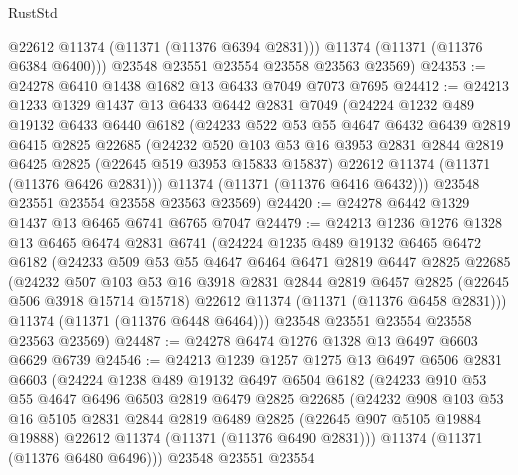 \begin{lexlean}{RustStd}
\begin{coremodule}
          @22612
          @11374
          (@11371 (@11376 @6394 @2831)))
        @11374
        (@11371 (@11376 @6384 @6400)))
      @23548
      @23551
      @23554
      @23558
      @23563
      @23569)
@24353 := @24278 @6410 @1438 @1682 @13 @6433 @7049 @7073 @7695
@24412 := @24213
    @1233
    @1329
    @1437
    @13
    @6433
    @6442
    @2831
    @7049
    (@24224
      @1232
      @489
      @19132
      @6433
      @6440
      @6182
      (@24233
        @522
        @53
        @55
        @4647
        @6432
        @6439
        @2819
        @6415
        @2825
        @22685
        (@24232
          @520
          @103
          @53
          @16
          @3953
          @2831
          @2844
          @2819
          @6425
          @2825
          (@22645 @519 @3953 @15833 @15837)
          @22612
          @11374
          (@11371 (@11376 @6426 @2831)))
        @11374
        (@11371 (@11376 @6416 @6432)))
      @23548
      @23551
      @23554
      @23558
      @23563
      @23569)
@24420 := @24278 @6442 @1329 @1437 @13 @6465 @6741 @6765 @7047
@24479 := @24213
    @1236
    @1276
    @1328
    @13
    @6465
    @6474
    @2831
    @6741
    (@24224
      @1235
      @489
      @19132
      @6465
      @6472
      @6182
      (@24233
        @509
        @53
        @55
        @4647
        @6464
        @6471
        @2819
        @6447
        @2825
        @22685
        (@24232
          @507
          @103
          @53
          @16
          @3918
          @2831
          @2844
          @2819
          @6457
          @2825
          (@22645 @506 @3918 @15714 @15718)
          @22612
          @11374
          (@11371 (@11376 @6458 @2831)))
        @11374
        (@11371 (@11376 @6448 @6464)))
      @23548
      @23551
      @23554
      @23558
      @23563
      @23569)
@24487 := @24278 @6474 @1276 @1328 @13 @6497 @6603 @6629 @6739
@24546 := @24213
    @1239
    @1257
    @1275
    @13
    @6497
    @6506
    @2831
    @6603
    (@24224
      @1238
      @489
      @19132
      @6497
      @6504
      @6182
      (@24233
        @910
        @53
        @55
        @4647
        @6496
        @6503
        @2819
        @6479
        @2825
        @22685
        (@24232
          @908
          @103
          @53
          @16
          @5105
          @2831
          @2844
          @2819
          @6489
          @2825
          (@22645 @907 @5105 @19884 @19888)
          @22612
          @11374
          (@11371 (@11376 @6490 @2831)))
        @11374
        (@11371 (@11376 @6480 @6496)))
      @23548
      @23551
      @23554

\end{coremodule}
\end{lexlean}
